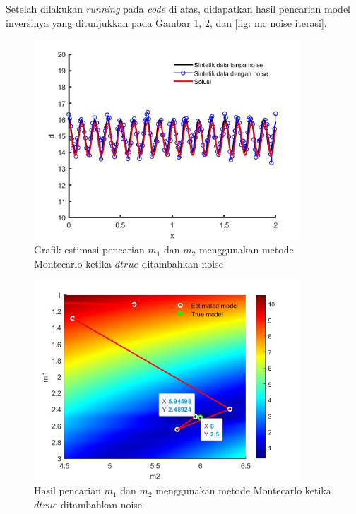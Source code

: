 \documentclass{article}
\begin{document}
Setelah dilakukan \textit{running} pada \textit{code} di atas, didapatkan hasil pencarian model inversinya yang ditunjukkan pada Gambar \ref{fig: mc noise true sol}, \ref{fig: mc noise true mod}, dan \ref{fig: mc noise iterasi}.
\begin{figure}[h]
    \centering
    \includegraphics[width=10cm]{figure/mc noise true solution.jpg}
    \caption{Grafik estimasi pencarian $m_1$ dan $m_2$ menggunakan metode Montecarlo ketika $dtrue$ ditambahkan noise}
    \label{fig: mc noise true sol}
\end{figure}
\begin{figure}[h]
    \centering
    \includegraphics[width=10cm]{figure/mc noise true model.jpg}
    \caption{Hasil pencarian $m_1$ dan $m_2$ menggunakan metode Montecarlo ketika $dtrue$ ditambahkan noise}
    \label{fig: mc noise true mod}
\end{figure}
\end{document}
